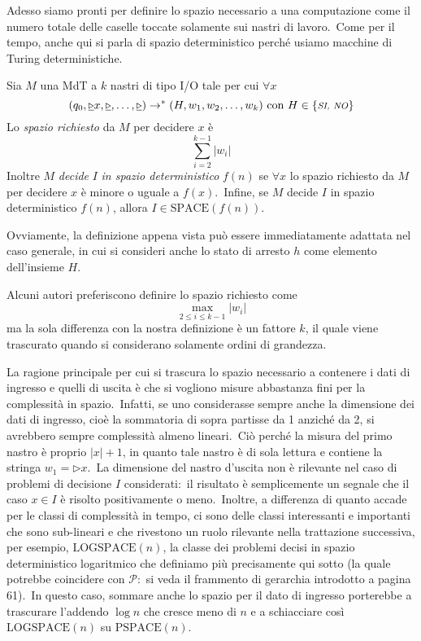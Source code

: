 \noindent Adesso siamo pronti per definire lo spazio necessario a una computazione come il numero totale delle caselle toccate solamente sui nastri di lavoro.\
Come per il tempo, anche qui si parla di spazio deterministico perché usiamo macchine di Turing deterministiche.\

\begin{definition}
    Sia $M$ una MdT a $k$ nastri di tipo I/O tale per cui $\forall x$
    \[(q_0, \underline{\triangleright} x, \underline{\triangleright}, \dots, \underline{\triangleright}) \rightarrow^* (H, w_1,w_2, \dots, w_k) \text{ con } H \in \{\mbox{\textit{\footnotesize SI, NO}}\} \]
    Lo \textit{spazio richiesto} da $M$ per decidere $x$ è
    \[\sum^{k-1}_{i=2} |w_i|\]
    Inoltre $M$ \textit{decide} $I$ \textit{in spazio deterministico} $f(n)$ se $\forall x$ lo spazio richiesto da $M$ per decidere $x$ è minore o uguale a $f(x)$.\
    Infine, se $M$ decide $I$ in spazio deterministico $f(n)$, allora $I \in \mathrm{SPACE}(f(n))$.
\end{definition}

\noindent Ovviamente, la definizione appena vista può essere immediatamente adattata nel caso generale, in cui si consideri anche lo stato di arresto $h$ come elemento dell'insieme $H$.

Alcuni autori preferiscono definire lo spazio richiesto come
\[\max_{2 \leq i \leq k-1} |w_i|\]
ma la sola differenza con la nostra definizione è un fattore $k$, il quale viene trascurato quando si considerano solamente ordini di grandezza.\

\medskip
\noindent La ragione principale per cui si trascura lo spazio necessario a contenere i dati di ingresso e quelli di uscita è che si vogliono misure abbastanza fini per la complessità in spazio.\
Infatti, se uno considerasse sempre anche la dimensione dei dati di ingresso, cioè la sommatoria di sopra partisse da 1 anziché da 2, si avrebbero sempre complessità almeno lineari.\
Ciò perché la misura del primo nastro è proprio $|x| + 1$, in quanto tale nastro è di sola lettura e contiene la stringa $w_1 = \triangleright x$.\
La dimensione del nastro d'uscita non è rilevante nel caso di problemi di decisione $I$ considerati:\ il risultato è semplicemente un segnale che il caso $x \in I$ è risolto positivamente o meno.\
Inoltre, a differenza di quanto accade per le classi di complessità in tempo, ci sono delle classi interessanti e importanti che sono sub-lineari e che rivestono un ruolo rilevante nella trattazione successiva, per esempio, $\mathrm{LOGSPACE}(n)$, la classe dei problemi decisi in spazio deterministico logaritmico che definiamo più precisamente qui sotto (la quale potrebbe coincidere con $\mathcal{P}$:\ si veda il frammento di gerarchia introdotto a pagina 61).\
In questo caso, sommare anche lo spazio per il dato di ingresso porterebbe a trascurare l'addendo $\log n$ che cresce meno di $n$ e a schiacciare così $\mathrm{LOGSPACE}(n)$ su $\mathrm{PSPACE}(n)$.\

